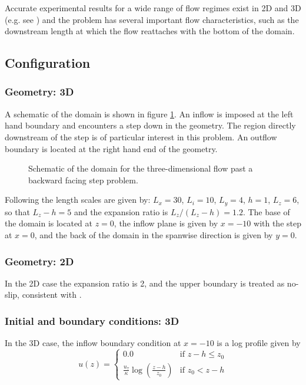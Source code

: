 Accurate experimental results for a wide range of flow regimes exist
in 2D and 3D
(e.g. see \cite{armaly1983}) and the problem has several important flow
characteristics, such as the downstream length at which the flow reattaches
with the bottom of the domain.


\subsection{Configuration}
\subsubsection{Geometry: 3D}
A schematic of the domain is shown in figure \ref{Fig:Schematic3d}.
An inflow is imposed at the left hand boundary and encounters a step
down in the geometry. The region directly downstream of the step is
of particular interest in this problem. An outflow boundary is located at the
right hand end of the geometry.

\begin{figure}
\centering
{}
\caption{Schematic of the domain for the three-dimensional flow past a backward facing step
problem.}
\label{Fig:Schematic3d}
\end{figure}

Following \cite{le1997} the length scales are given by: $L_x=30$, $L_i=10$, $L_y=4$, $h=1$, $L_z=6$,
so that $L_z-h=5$ and the expansion ratio is $L_z/(L_z-h)=1.2$.
The base of the domain is located at $z=0$, the inflow plane is given by $x=-10$ with the step
at $x=0$, and the back of the domain in the spanwise direction is given by $y=0$.

\subsubsection{Geometry: 2D}
In the 2D case the expansion ratio is 2, and the upper boundary is treated as no-slip,
consistent with \cite{armaly1983}.



\subsubsection{Initial and boundary conditions: 3D}
In the 3D case, the inflow boundary condition at $x=-10$ is a log profile given by
\begin{equation*}
u(z) =
  \begin{cases}
    0.0 & \text{if } z-h \leq z_0 \\
    \frac{u_{\tau}}{\kappa} \log \left(\frac{z - h}{z_0}\right) & \text{if } z_0 < z-h
  \end{cases}
\end{equation*}

